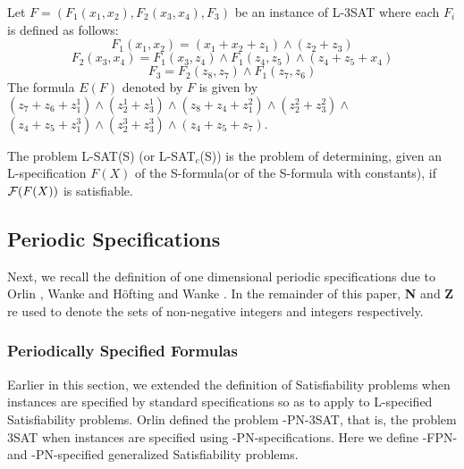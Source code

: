 \begin{example}
Let $F= (F_1(x_1,x_2),F_{2}(x_3,x_4), F_3)$
be an instance of {\sf L-3SAT} where each $F_i$ is defined as follows:
\[F_1(x_1,x_2) = (x_1 + x_2 + z_1) \wedge (z_2 + z_3) \]
\[F_2(x_3,x_4) = F_1(x_3, z_4) \wedge F_1(z_4, z_5) \wedge
                               (z_4 + z_5 + x_4)   \]
\[F_3 = F_2(z_8,z_7) \wedge  F_1(z_7,z_6) \]
The formula $E(F)$ denoted by $F$ is given by 
$ (z_7 + z_6 + z_1^1) \wedge (z_2^1 + z_3^1) \wedge
(z_8 + z_4 + z_1^2) \wedge (z_2^2 + z_3^2) \wedge $
$(z_4 + z_5 + z_1^3) \wedge (z_2^3 + z_3^3) \wedge (z_4 + z_5 + z_7)$. 

\end{example}


\begin{definition}
The problem {\sf L-SAT(S)} (or {\sf L-SAT}$_c${\sf (S)}) is the
problem of determining, given an L-specification $F(X)$ of the S-formula(or of
the S-formula with constants), if ${\cal F}(F(X))$ is satisfiable.
\end{definition}
 






\subsection{Periodic Specifications }\label{sec:fpn_spec}
Next, we recall the definition of one dimensional periodic specifications 
due to  Orlin \cite{Or82a}, Wanke \cite{Wa93} and 
H\"ofting and Wanke \cite{HW92}. 
In the remainder of this paper, {\bf N} and {\bf Z} re used to 
denote the sets of non-negative integers and integers respectively.



\subsubsection{Periodically Specified Formulas}

Earlier in this section, we extended
the definition of Satisfiability problems when instances are specified
by standard specifications so as to apply to 
{\sf L}-specified Satisfiability problems. Orlin \cite{Or82a} 
defined the problem {-PN-3SAT}, that is, the problem {\sf 3SAT} when 
instances are specified using {-PN}-specifications.
Here we define {-FPN}- and {-PN}-specified generalized Satisfiability
problems.




